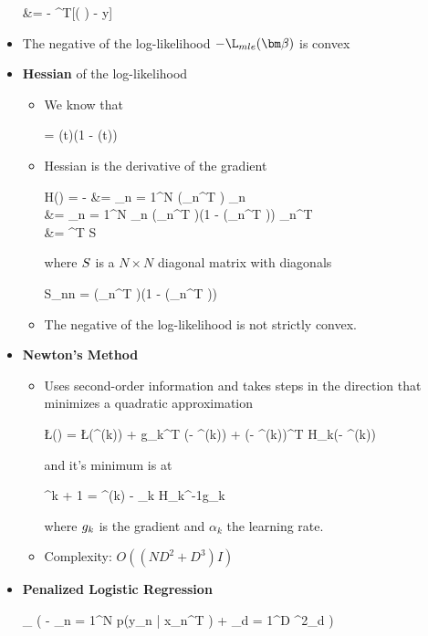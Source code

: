 \begin{itemize}
\begin{myalign*}
	    &= - ^T[\sigma( \bm \beta) - \*y]
	\end{myalign*}
	\item The negative of the log-likelihood $- \L_{mle}(\bm \beta)$ is convex
	\item \textbf{Hessian} of the log-likelihood
	\begin{itemize}
		\item We know that
		\begin{myalign*}
		     = \sigma(t)(1 - \sigma(t))
		\end{myalign*}
		\item Hessian is the derivative of the gradient
		\begin{myalign*}
		    \*H(\bm \beta) = -   &= \sum_{n = 1}^N  \sigma(_n^T \bm \beta) \tilde{\*x}_n\\
		    &= \sum_{n = 1}^N _n \sigma(_n^T \bm \beta)(1 - \sigma(_n^T \bm \beta)) _n^T\\
		    &= ^T \*S \tilde{\*X}
		\end{myalign*}
		where $\*S$ is a $N \times N$ diagonal matrix with diagonals
		\begin{myalign*}
		    S_{nn} = \sigma(_n^T \bm \beta)(1 - \sigma(_n^T \bm \beta))
		\end{myalign*}
		\item The negative of the log-likelihood is not strictly convex.
	\end{itemize}
	\item \textbf{Newton's Method} %
	\begin{itemize}
		\item Uses second-order information and takes steps in the direction that minimizes a quadratic approximation
		\begin{myalign*}
		    \L(\bm \beta) = \L(\bm \beta^{(k)}) + \*g_k^T (\bm \beta - \bm \beta^{(k)}) + (\bm \beta - \bm \beta^{(k)})^T \*H_k(\bm \beta - \bm \beta^{(k)})
		\end{myalign*}
		and it's minimum is at
		\begin{myalign*}
		    \bm \beta^{k + 1} = \bm \beta^{(k)} - \alpha_k \*H_k^{-1}\*g_k
		\end{myalign*}
		where $\*g_k$ is the gradient and $\alpha_k$ the learning rate.
		\item Complexity: $O((ND^2 + D^3)I)$
	\end{itemize}
	\item \textbf{Penalized Logistic Regression}
	\begin{myalign*}
	    \min_{\bm \beta} 
	    \left(
	    	- \sum_{n = 1}^N \log p(y_n | \*x_n^T \bm \beta) + \lambda \sum_{d = 1}^D \beta^2_d
	    \right)
	\end{myalign*}
\end{itemize}

